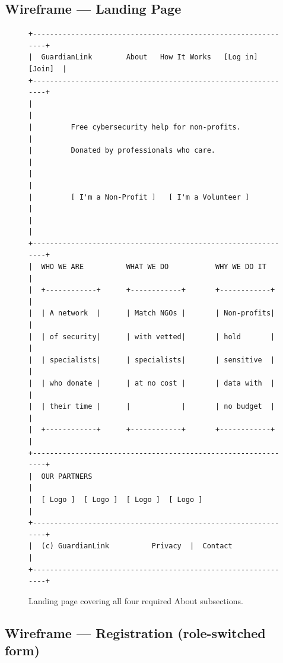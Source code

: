 \documentclass[11pt,letterpaper]{article}
\begin{document}
\subsection{Wireframe --- Landing Page}

\begin{figure}[H]
\centering
\begin{BVerbatim}[fontsize=\footnotesize]
+--------------------------------------------------------------+
|  GuardianLink        About   How It Works   [Log in] [Join]  |
+--------------------------------------------------------------+
|                                                              |
|         Free cybersecurity help for non-profits.             |
|         Donated by professionals who care.                   |
|                                                              |
|         [ I'm a Non-Profit ]   [ I'm a Volunteer ]           |
|                                                              |
+--------------------------------------------------------------+
|  WHO WE ARE          WHAT WE DO           WHY WE DO IT       |
|  +------------+      +------------+       +------------+     |
|  | A network  |      | Match NGOs |       | Non-profits|     |
|  | of security|      | with vetted|       | hold       |     |
|  | specialists|      | specialists|       | sensitive  |     |
|  | who donate |      | at no cost |       | data with  |     |
|  | their time |      |            |       | no budget  |     |
|  +------------+      +------------+       +------------+     |
+--------------------------------------------------------------+
|  OUR PARTNERS                                                |
|  [ Logo ]  [ Logo ]  [ Logo ]  [ Logo ]                      |
+--------------------------------------------------------------+
|  (c) GuardianLink          Privacy  |  Contact               |
+--------------------------------------------------------------+
\end{BVerbatim}
\caption{Landing page covering all four required About subsections.}
\end{figure}

\subsection{Wireframe --- Registration (role-switched form)}
\end{document}
